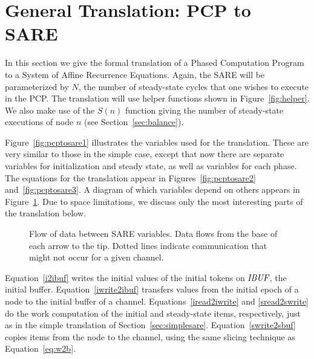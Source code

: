 \section{General Translation: PCP to SARE}
\label{sec:translate}

In this section we give the formal translation of a Phased Computation
Program to a System of Affine Recurrence Equations.  Again, the SARE
will be parameterized by $N$, the number of steady-state cycles that
one wishes to execute in the PCP.  The translation will use helper
functions shown in Figure~\ref{fig:helper}.  We also make use of the
$S(n)$ function giving the number of steady-state executions of node
$n$ (see Section~\ref{sec:balance}).



Figure~\ref{fig:pcptosare1} illustrates the variables used for the
translation.  These are very similar to those in the simple case,
except that now there are separate variables for initialization and
steady state, as well as variables for each phase.  The equations for
the translation appear in Figures~\ref{fig:pcptosare2}
and~\ref{fig:pcptosare3}.  A diagram of which variables depend on
others appears in Figure~\ref{fig:communic}.  Due to space
limitations, we discuss only the most interesting parts of the
translation below.

\begin{figure}[t]
\centering
{}
\parbox{4in}{\caption{Flow of data between SARE variables.  Data flows from the base of each arrow to the tip.  Dotted lines indicate communication that might not occur for a given channel.}
\protect\label{fig:communic}}
\end{figure}

Equation~\ref{i2ibuf} writes the initial values of the initial tokens
on $\mbox{\it IBUF}$, the initial buffer.  Equation~\ref{iwrite2ibuf}
transfers values from the initial epoch of a node to the initial
buffer of a channel.  Equations~\ref{iread2iwrite} and
\ref{sread2swrite} do the work computation of the initial and
steady-state items, respectively, just as in the simple translation of
Section~\ref{sec:simplesare}.  Equation~\ref{swrite2sbuf} copies items
from the node to the channel, using the same slicing technique as
Equation~\ref{eq:w2b}.

